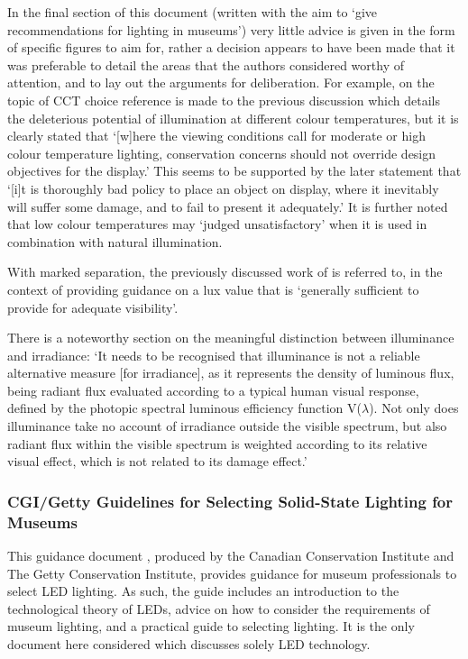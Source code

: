 
In the final section of this document (written with the aim to `give recommendations for lighting in museums') very little advice is given in the form of specific figures to aim for, rather a decision appears to have been made that it was preferable to detail the areas that the authors considered worthy of attention, and to lay out the arguments for deliberation. For example, on the topic of \gls{CCT} choice reference is made to the previous discussion which details the deleterious potential of illumination at different colour temperatures, but it is clearly stated that `[w]here the viewing conditions call for moderate or high colour temperature lighting, conservation concerns should not override design objectives for the display.' This seems to be supported by the later statement that `[i]t is thoroughly bad policy to place an object on display, where it inevitably will suffer some damage, and to fail to present it adequately.' It is further noted that low colour temperatures may `judged unsatisfactory' when it is used in combination with natural illumination. 

With marked separation, the previously discussed work of \citet{loe_preferred_1982} is referred to, in the context of providing guidance on a lux value that is `generally sufficient to provide for adequate visibility'.

There is a noteworthy section on the meaningful distinction between illuminance and irradiance: `It needs to be recognised that illuminance is not a reliable alternative measure [for irradiance], as it represents the density of luminous flux, being radiant flux evaluated according to a typical human visual response, defined by the photopic spectral luminous efficiency function V($\lambda$). Not only does illuminance take no account of irradiance outside the visible spectrum, but also radiant flux within the visible spectrum is weighted according to its relative visual effect, which is not related to its damage effect.'

\subsubsection{CGI/Getty Guidelines for Selecting Solid-State Lighting for Museums}

This guidance document \citep{druzik_guidelines_2012}, produced by the Canadian Conservation Institute and The Getty Conservation Institute, provides guidance for museum professionals to select \gls{LED} lighting. As such, the guide includes an introduction to the technological theory of \glspl{LED}, advice on how to consider the requirements of museum lighting, and a practical guide to selecting lighting. It is the only document here considered which discusses solely LED technology.

